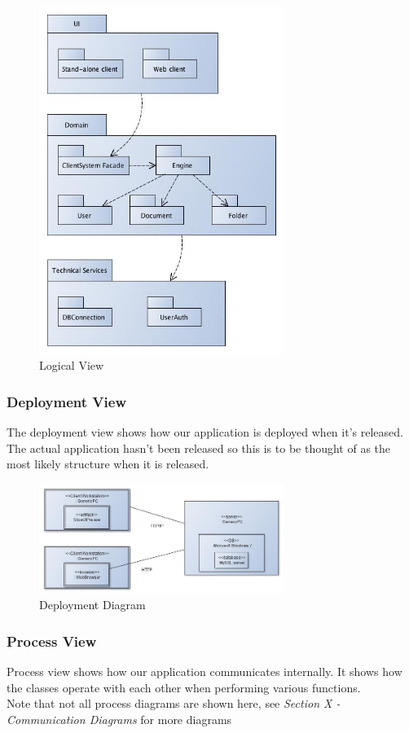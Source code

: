 \documentclass[11pt]{article}
\begin{document}
\begin{figure}[H]
  		\centering
    	\includegraphics[width=300px]{images/SAD/LogicalView_UML.jpg}
    	\caption{Logical View}
\end{figure}

\subsubsection{Deployment View}
\label{sec-4-1-5}
The deployment view shows how our application is deployed when it's released. The actual application hasn't been released so this is to be thought of as the most likely structure when it is released.

\begin{figure}[H]
  		\centering
    	\includegraphics[width=300px]{images/Deployment Diagram.jpg}
    	\caption{Deployment Diagram}
\end{figure}
\subsubsection{Process View}
\label{sec-4-1-6}
Process view shows how our application communicates internally. It shows how the classes operate with each other when performing various functions. \\
Note that not all process diagrams are shown here, see \emph{Section X - Communication Diagrams} for more diagrams
\end{document}

